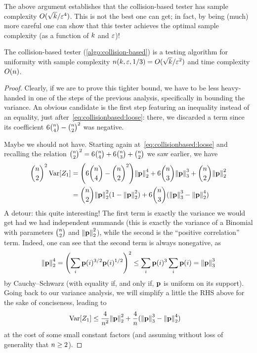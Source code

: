 The above argument establishes that the collision-based tester has sample complexity $O(\sqrt{k}/\varepsilon^4)$. This is not the best one can get; in fact, by being (much) more careful one can show that this tester achieves the optimal sample complexity (as a function of $k$ and $\varepsilon$)!
\begin{theorem}
  \label{theo:collision-based}
The collision-based tester (\cref{algo:collision-based}) is a testing algorithm for uniformity with sample complexity $n(k,\varepsilon,1/3) = O(\sqrt{k}/\varepsilon^2)$ and time complexity $O(n)$.
\end{theorem}
\begin{proof}
  Clearly, if we are to prove this tighter bound, we have to be less heavy-handed in one of the steps of the previous analysis, specifically in bounding the variance. An obvious candidate is the first step featuring an inequality instead of an equality, just after~\cref{eq:collisionbased:loose}: there, we discarded a term since its coefficient $6\binom{n}{4} - \binom{n}{2}^2$ was negative.
  
  Maybe we should not have. Starting again at~\cref{eq:collisionbased:loose} and recalling the relation
  $
    \binom{n}{2}^2 = 6\binom{n}{4} + 6\binom{n}{3} + \binom{n}{2}
  $ we saw earlier, we have 
  \begin{align}
  \binom{\ns}{2}^2\Var[Z_1]
   &= \Paren{6\binom{\ns}{4} - \binom{\ns}{2}^2}\normtwo{\p}^4+6\binom{\ns}{3}\norm{\p}_3^3+\binom{\ns}{2}\normtwo{\p}^2 \notag\\
   &= \binom{\ns}{2}\normtwo{\p}^2(1-\normtwo{\p}^2) + 6\binom{\ns}{3}(\norm{\p}_3^3-\normtwo{\p}^4)
  \end{align}
  A detour: this quite interesting! The first term is exactly the variance we would get had we had independent summands (this is exactly the variance of a Binomial with parameters $\binom{n}{2}$ and $\normtwo{\p}^2$), while the second is the ``positive correlation'' term. Indeed, one can see that the second term is always nonegative, as
  \[
      \normtwo{\p}^4 %
      = \Paren{\sum_{i} \p(i)^{3/2} \p(i)^{1/2} }^2
      \leq \sum_{i} \p(i)^{3} \sum_{i}\p(i) = \norm{\p}_3^3
  \]
  by Cauchy--Schwarz (with equality if, and only if, $\mathbf{p}$ is uniform on its support). Going back to our variance analysis, we will simplify a little the RHS above for the sake of conciseness, leading to
  \begin{align}
    \label{eq:good:variance}
  \Var[Z_1]
   &\leq \frac{4}{\ns^2}\normtwo{\p}^2 + \frac{4}{\ns}(\norm{\p}_3^3-\normtwo{\p}^4)
  \end{align}
  at the cost of some small constant factors (and assuming without loss of generality that $n \geq 2$).
  

\end{proof}
